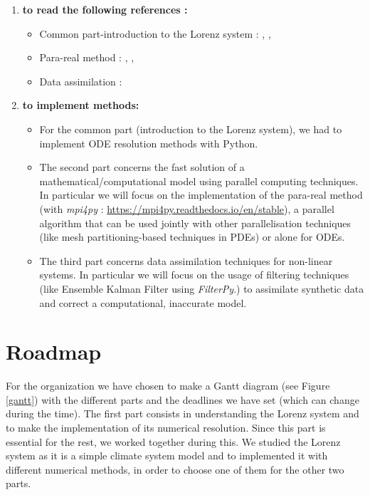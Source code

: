 \documentclass[12pt]{article}
\begin{document}
 	\begin{enumerate}[label=\textbullet]
 		\item \textbf{to read the following references :}
 		\begin{itemize}
 			\item Common part-introduction to the Lorenz system : \cite{partie1_ref1},  \cite{partie1_ref2},  \cite{partie1_ref3}
 			\item Para-real method : \cite{partie2_ref1}, \cite{partie2_ref2},  \cite{partie2_ref3}
 			\item Data assimilation : \cite{partie3_ref2}
 		\end{itemize}
 		\item \textbf{to implement methods:} 
 		\begin{itemize}
 			\item For the common part (introduction to the Lorenz system), we had to implement ODE resolution methods with Python.
 			\item The second part concerns the fast solution of a mathematical/computational model using parallel computing techniques. In particular we will focus on the implementation of the para-real method (with \textit{mpi4py} : \url{https://mpi4py.readthedocs.io/en/stable}), a parallel algorithm that can be used jointly with other parallelisation  techniques (like mesh partitioning-based techniques in PDEs) or alone for ODEs.
 			\item The third part concerns data assimilation techniques for non-linear systems. In particular we will focus on the usage of filtering techniques (like Ensemble Kalman Filter using \textit{FilterPy}.) to assimilate synthetic data and correct a computational, inaccurate model.
 		\end{itemize}
 	\end{enumerate}
 
 	\section{Roadmap}
 	
 	\noindent For the organization we have chosen to make a Gantt diagram (see Figure \ref{gantt}) with the different parts and the deadlines we have set (which can change during the time). The first part consists in understanding the Lorenz system and to make the implementation of its numerical resolution. Since this part is essential for the rest, we worked together during this.
 	We studied the Lorenz system as it is a simple climate system model and to implemented it with different numerical methods, in order to choose one of them for the other two parts. 
 	
\end{document}
